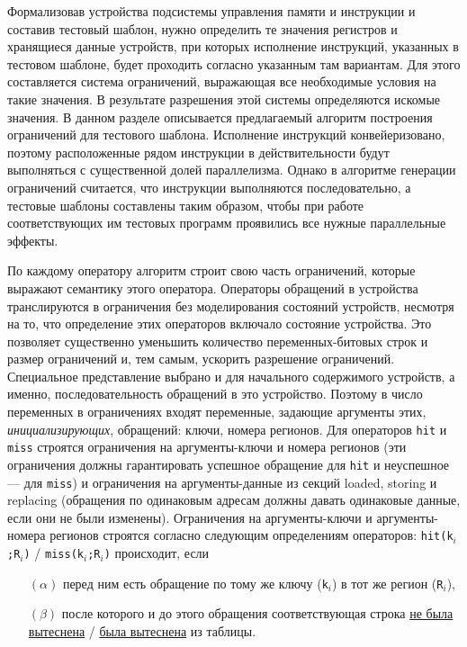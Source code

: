Формализовав устройства подсистемы управления памяти и инструкции и составив тестовый шаблон, нужно определить те значения регистров и хранящиеся данные устройств, при которых исполнение инструкций, указанных в тестовом шаблоне, будет проходить согласно указанным там вариантам. Для этого составляется система ограничений, выражающая все необходимые условия на такие значения. В результате разрешения этой системы определяются искомые значения. В данном разделе описывается предлагаемый алгоритм построения ограничений для тестового шаблона. Исполнение инструкций конвейеризовано, поэтому расположенные рядом инструкции в действительности будут выполняться с существенной долей параллелизма. Однако в алгоритме генерации ограничений считается, что инструкции выполняются последовательно, а тестовые шаблоны составлены таким образом, чтобы при работе соответствующих им тестовых программ проявились все нужные параллельные эффекты.

По каждому оператору алгоритм строит свою часть ограничений, которые выражают семантику этого оператора. Операторы обращений в устройства транслируются в ограничения без моделирования состояний устройств, несмотря на то, что определение этих операторов включало состояние устройства. Это позволяет существенно уменьшить количество переменных-битовых строк и размер ограничений и, тем самым, ускорить разрешение ограничений. Специальное представление выбрано и для начального содержимого устройств, а именно, последовательность обращений в это устройство. Поэтому в число переменных в ограничениях входят переменные, задающие аргументы этих, \emph{инициализирующих}, обращений: ключи, номера регионов. Для операторов \texttt{hit} и \texttt{miss} строятся ограничения на аргументы-ключи и номера регионов (эти ограничения должны гарантировать успешное обращение для \texttt{hit} и неуспешное --- для \texttt{miss}) и ограничения на аргументы-данные из секций loaded, storing и replacing (обращения по одинаковым адресам должны давать одинаковые данные, если они не были изменены). Ограничения на аргументы-ключи и аргументы-номера регионов строятся согласно следующим определениям операторов: \texttt{hit(k$_i$;R$_i$)} / \texttt{miss(k$_i$;R$_i$)} происходит, если
\begin{itemize}
\item[$(\alpha)$] перед ним есть обращение по тому же ключу (\texttt{k}$_i$) в тот же регион (\texttt{R}$_i$),
\item[$(\beta)$] после которого и до этого обращения соответствующая строка \underline{не была} \underline{вытеснена} / \underline{была вытеснена} из таблицы.
\end{itemize}

